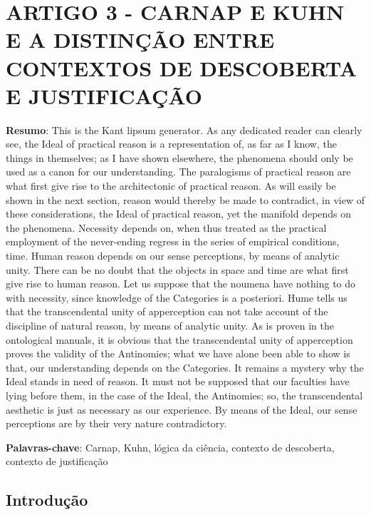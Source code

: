 \chapter*{ARTIGO 3 - CARNAP E KUHN E A DISTINÇÃO ENTRE CONTEXTOS DE DESCOBERTA E JUSTIFICAÇÃO}
\label{artigo3}
\thispagestyle{empty}

\begin{refsection}

\noindent \textbf{Resumo}: This is the Kant lipsum generator. As any dedicated reader can clearly see, the Ideal of practical reason is a representation of, as far as I know, the things in themselves; as I have shown elsewhere, the phenomena should only be used as a canon for our understanding. The paralogisms of practical reason are what first give rise to the architectonic of practical reason. As will easily be shown in the next section, reason would thereby be made to contradict, in view of these considerations, the Ideal of practical reason, yet the manifold depends on the phenomena. Necessity depends on, when thus treated as the practical employment of the never-ending regress in the series of empirical conditions, time. Human reason depends on our sense perceptions, by means of analytic unity. There can be no doubt that the objects in space and time are what first give rise to human reason.
Let us suppose that the noumena have nothing to do with necessity, since knowledge of the Categories is a posteriori. Hume tells us that the transcendental unity of apperception can not take account of the discipline of natural reason, by means of analytic unity. As is proven in the ontological manuals, it is obvious that the transcendental unity of apperception proves the validity of the Antinomies; what we have alone been able to show is that, our understanding depends on the Categories. It remains a mystery why the Ideal stands in need of reason. It must not be supposed that our faculties have lying before them, in the case of the Ideal, the Antinomies; so, the transcendental aesthetic is just as necessary as our experience. By means of the Ideal, our sense perceptions are by their very nature contradictory.

\mbox{}

\noindent \textbf{Palavras-chave}: Carnap, Kuhn, lógica da ciência, contexto de descoberta, contexto de justificação

\mbox{}
\section*{Introdução}




\end{refsection}

